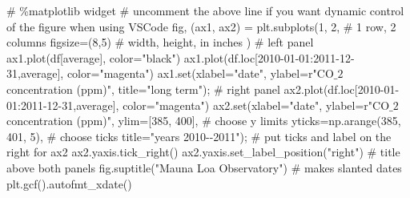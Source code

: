 \documentclass[
  letterpaper,
  DIV=11,
  numbers=noendperiod,
  oneside]{scrreprt}
\newenvironment{Shaded}{\begin{snugshade}}{\end{snugshade}}
\newcommand{\BuiltInTok}[1]{\textcolor[rgb]{0.00,0.23,0.31}{#1}}
\newcommand{\CommentTok}[1]{\textcolor[rgb]{0.37,0.37,0.37}{#1}}
\newcommand{\DecValTok}[1]{\textcolor[rgb]{0.68,0.00,0.00}{#1}}
\newcommand{\NormalTok}[1]{\textcolor[rgb]{0.00,0.23,0.31}{#1}}
\newcommand{\OperatorTok}[1]{\textcolor[rgb]{0.37,0.37,0.37}{#1}}
\newcommand{\StringTok}[1]{\textcolor[rgb]{0.13,0.47,0.30}{#1}}
\newcommand{\VerbatimStringTok}[1]{\textcolor[rgb]{0.13,0.47,0.30}{#1}}
\begin{document}
\begin{Shaded}
\begin{Highlighting}[]
\CommentTok{\# \%matplotlib widget}
\CommentTok{\# uncomment the above line if you want dynamic control of the figure when using VSCode}
\NormalTok{fig, (ax1, ax2) }\OperatorTok{=}\NormalTok{ plt.subplots(}\DecValTok{1}\NormalTok{, }\DecValTok{2}\NormalTok{,  }\CommentTok{\# 1 row, 2 columns}
\NormalTok{                               figsize}\OperatorTok{=}\NormalTok{(}\DecValTok{8}\NormalTok{,}\DecValTok{5}\NormalTok{)  }\CommentTok{\# width, height, in inches}
\NormalTok{                               )}
\CommentTok{\# left panel}
\NormalTok{ax1.plot(df[}\StringTok{\textquotesingle{}average\textquotesingle{}}\NormalTok{], color}\OperatorTok{=}\StringTok{"black"}\NormalTok{)}
\NormalTok{ax1.plot(df.loc[}\StringTok{\textquotesingle{}2010{-}01{-}01\textquotesingle{}}\NormalTok{:}\StringTok{\textquotesingle{}2011{-}12{-}31\textquotesingle{}}\NormalTok{,}\StringTok{\textquotesingle{}average\textquotesingle{}}\NormalTok{], color}\OperatorTok{=}\StringTok{"magenta"}\NormalTok{)}
\NormalTok{ax1.}\BuiltInTok{set}\NormalTok{(xlabel}\OperatorTok{=}\StringTok{"date"}\NormalTok{,}
\NormalTok{       ylabel}\OperatorTok{=}\VerbatimStringTok{r"CO$\_2$ concentration (ppm)"}\NormalTok{,}
\NormalTok{       title}\OperatorTok{=}\StringTok{"long term"}\NormalTok{)}\OperatorTok{;}
\CommentTok{\# right panel}
\NormalTok{ax2.plot(df.loc[}\StringTok{\textquotesingle{}2010{-}01{-}01\textquotesingle{}}\NormalTok{:}\StringTok{\textquotesingle{}2011{-}12{-}31\textquotesingle{}}\NormalTok{,}\StringTok{\textquotesingle{}average\textquotesingle{}}\NormalTok{], color}\OperatorTok{=}\StringTok{"magenta"}\NormalTok{)}
\NormalTok{ax2.}\BuiltInTok{set}\NormalTok{(xlabel}\OperatorTok{=}\StringTok{"date"}\NormalTok{,}
\NormalTok{        ylabel}\OperatorTok{=}\VerbatimStringTok{r"CO$\_2$ concentration (ppm)"}\NormalTok{,}
\NormalTok{        ylim}\OperatorTok{=}\NormalTok{[}\DecValTok{385}\NormalTok{, }\DecValTok{400}\NormalTok{],  }\CommentTok{\# choose y limits}
\NormalTok{        yticks}\OperatorTok{=}\NormalTok{np.arange(}\DecValTok{385}\NormalTok{, }\DecValTok{401}\NormalTok{, }\DecValTok{5}\NormalTok{),  }\CommentTok{\# choose ticks}
\NormalTok{        title}\OperatorTok{=}\StringTok{"years 2010{-}{-}2011"}\NormalTok{)}\OperatorTok{;}
\CommentTok{\# put ticks and label on the right for ax2}
\NormalTok{ax2.yaxis.tick\_right()}
\NormalTok{ax2.yaxis.set\_label\_position(}\StringTok{"right"}\NormalTok{)}
\CommentTok{\# title above both panels}
\NormalTok{fig.suptitle(}\StringTok{"Mauna Loa Observatory"}\NormalTok{)}
\CommentTok{\# makes slanted dates}
\NormalTok{plt.gcf().autofmt\_xdate()}
\end{Highlighting}
\end{Shaded}
\end{document}
